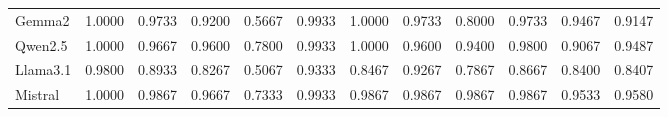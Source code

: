\begin{table}
{\begin{tabular}{lcccccccccc||c}
            Gemma2                             & 1.0000                                                  & 0.9733                                                  & 0.9200                                                  & 0.5667                                                            & 0.9933                                                  & 1.0000                                                    & 0.9733                                                            & 0.8000                                                  & 0.9733                                 & 0.9467                                   & 0.9147 \\
            Qwen2.5                            & 1.0000                                                  & 0.9667                                                  & 0.9600                                                  & 0.7800                                                            & 0.9933                                                  & 1.0000                                                    & 0.9600                                                            & 0.9400                                                  & 0.9800                                 & 0.9067                                   & 0.9487 \\
            Llama3.1                           & 0.9800                                                  & 0.8933                                                  & 0.8267                                                  & 0.5067                                                            & 0.9333                                                  & 0.8467                                                    & 0.9267                                                            & 0.7867                                                  & 0.8667                                 & 0.8400                                   & 0.8407 \\
            Mistral                            & 1.0000                                                  & 0.9867                                                  & 0.9667                                                  & 0.7333                                                            & 0.9933                                                  & 0.9867                                                    & 0.9867                                                            & 0.9867                                                  & 0.9867                                 & 0.9533                                   & 0.9580 \\

\end{tabular}}
\end{table}
